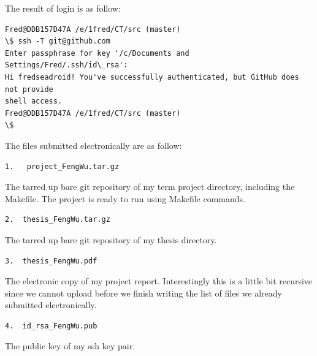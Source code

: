 \documentclass[12pt]{cls}
\begin{document}

The result of login is as follow:

\begin{verbatim}
Fred@DDB157D47A /e/1fred/CT/src (master)
\$ ssh -T git@github.com
Enter passphrase for key '/c/Documents and Settings/Fred/.ssh/id\_rsa':
Hi fredseadroid! You've successfully authenticated, but GitHub does not provide
shell access.
Fred@DDB157D47A /e/1fred/CT/src (master)
\$
\end{verbatim}

\newpage

The files submitted electronically are as follow:
\begin{verbatim}
1.   project_FengWu.tar.gz
\end{verbatim}
The tarred up bare git repository of my term project directory, including the Makefile. The project is ready to run using Makefile commands.

\begin{verbatim}
2.  thesis_FengWu.tar.gz
\end{verbatim}
The tarred up bare git repository of my thesis directory.

\begin{verbatim}
3.  thesis_FengWu.pdf
\end{verbatim}
The electronic copy of my project report. Interestingly this is a little bit recursive since we cannot upload before we finish writing the list of files we already submitted electronically.

\begin{verbatim}
4.  id_rsa_FengWu.pub
\end{verbatim}
The public key of my ssh key pair.


\end{document}
